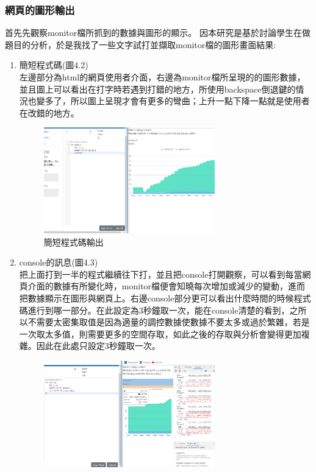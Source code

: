 \subsubsection{網頁的圖形輸出}
首先先觀察monitor檔所抓到的數據與圖形的顯示。
因本研究是基於討論學生在做題目的分析，於是我找了一些文字試打並擷取monitor檔的圖形畫面結果:
\begin{enumerate}[1.]
	\item 簡短程式碼(圖4.2)\\
	左邊部分為html的網頁使用者介面，右邊為monitor檔所呈現的的圖形數據，並且圖上可以看出在打字時若遇到打錯的地方，所使用backspace倒退鍵的情況也變多了，所以圖上呈現才會有更多的彎曲；上升一點下降一點就是使用者在改錯的地方。
	\begin{figure}[H] 
		\centering 
		\includegraphics[width=0.7\textwidth]{4_2.png} 
		\caption{簡短程式碼輸出} 
		\label{Fig.4.2} 
	\end{figure}
	\item console的訊息(圖4.3)\\
	把上面打到一半的程式繼續往下打，並且把console打開觀察，可以看到每當網頁介面的數據有所變化時，monitor檔便會知曉每次增加或減少的變動，進而把數據顯示在圖形與網頁上。右邊console部分更可以看出什麼時間的時候程式碼進行到哪一部分。在此設定為3秒鐘取一次，能在console清楚的看到，之所以不需要太密集取值是因為適量的調控數據使數據不要太多或過於繁雜，若是一次取太多值，則需要更多的空間存取，如此之後的存取與分析會變得更加複雜。因此在此處只設定3秒鐘取一次。
	\begin{figure}[H] 
		\centering 
		\includegraphics[width=0.7\textwidth]{4_3.png} 

\end{figure}
\end{enumerate}
